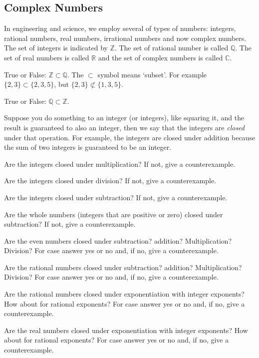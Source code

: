 \subsection{Complex Numbers}
In engineering and science, we employ several of types of numbers: integers, rational numbers, real numbers, irrational numbers and now complex numbers. The set of integers is indicated by $\mathbb{Z}$. The set of rational number is called $\mathbb{Q}$. The set of real numbers is called $\mathbb{R}$ and the set of complex numbers is called $\mathbb{C}$.
\par
\begin{alevel}
True or False: $\mathbb{Z} \subset \mathbb{Q}$. The $\subset$ symbol means `subset'. For example $\{2,3\} \subset \{2,3,5\}$, but $\{2,3\} \not\subset \{1,3,5\}$.
\end{alevel}
\begin{alevel}
True or False: $\mathbb{Q} \subset \mathbb{Z}$.
\end{alevel}

Suppose you do something to an integer (or integers), like squaring it, and the result is guaranteed to also an integer, then we say that the integers are \emph{closed} under that operation. For example, the integers are closed under addition because the sum of two integers is guaranteed to be an integer.
\par
\begin{blevel}
Are the integers closed under multiplication? If not, give a counterexample.
\end{blevel}
\begin{blevel}
Are the integers closed under division? If not, give a counterexample.
\end{blevel}
\begin{blevel}
Are the integers closed under subtraction? If not, give a counterexample.
\end{blevel}
\begin{blevel}
Are the whole numbers (integers that are positive or zero) closed under subtraction? If not, give a counterexample.
\end{blevel}
\begin{clevel}
Are the even numbers closed under subtraction? addition? Multiplication? Division? For case answer yes or no and, if no, give a counterexample.
\end{clevel}
\begin{clevel}
Are the rational numbers closed under subtraction? addition? Multiplication? Division? For case answer yes or no and, if no, give a counterexample.
\end{clevel}
\begin{clevel}
Are the rational numbers closed under exponentiation with integer exponents? How about for rational exponents? For case answer yes or no and, if no, give a counterexample.
\end{clevel}
\begin{clevel}
Are the real numbers closed under exponentiation with integer exponents? How about for rational exponents? For case answer yes or no and, if no, give a counterexample.
\end{clevel}

